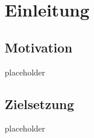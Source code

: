 \chapter{Einleitung}

\section{Motivation}
placeholder
\pagebreak

\section{Zielsetzung}
placeholder
\pagebreak